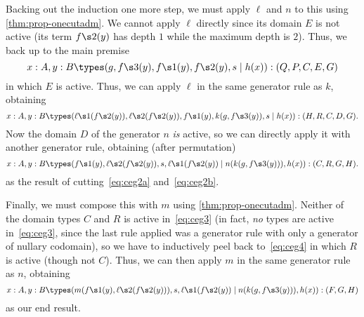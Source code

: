 Backing out the induction one more step, we must apply $\ell$ and $n$ to this using \cref{thm:prop-onecutadm}.
We cannot apply $\ell$ directly since its domain $E$ is not active (its term $f\s2(y)$ has depth $1$ while the maximum depth is $2$).
Thus, we back up to the main premise
\[ x:A,y:B \types (g,f\s3(y),f\s1(y),f\s2(y),s \mid h(x)) : (Q,P,C,E,G) \]
in which $E$ is active.
Thus, we can apply $\ell$ in the same generator rule as $k$, obtaining
\begin{equation}
  x:A,y:B \types (\ell\s1(f\s2(y)),\ell\s2(f\s2(y)),f\s1(y),k(g,f\s3(y)),s \mid h(x)) : (H,R,C,D,G).\label{eq:ceg4}
\end{equation}
Now the domain $D$ of the generator $n$ \emph{is} active, so we can directly apply it with another generator rule, obtaining (after permutation)
\begin{equation}
  x:A,y:B \types (f\s1(y),\ell\s2(f\s2(y)),s,\ell\s1(f\s2(y)) \mid n(k(g,f\s3(y))),h(x)) : (C,R,G,H).\label{eq:ceg3}
\end{equation}
as the result of cutting~\eqref{eq:ceg2a} and~\eqref{eq:ceg2b}.

Finally, we must compose this with $m$ using \cref{thm:prop-onecutadm}.
Neither of the domain types $C$ and $R$ is active in~\eqref{eq:ceg3} (in fact, \emph{no} types are active in~\eqref{eq:ceg3}, since the last rule applied was a generator rule with only a generator of nullary codomain), so we have to inductively peel back to~\eqref{eq:ceg4} in which $R$ is active (though not $C$).
Thus, we can then apply $m$ in the same generator rule as $n$, obtaining
\begin{equation}
  x:A,y:B \types (m(f\s1(y),\ell\s2(f\s2(y))),s,\ell\s1(f\s2(y)) \mid n(k(g,f\s3(y))),h(x)) : (F,G,H)\label{eq:ceg}
\end{equation}
as our end result.

